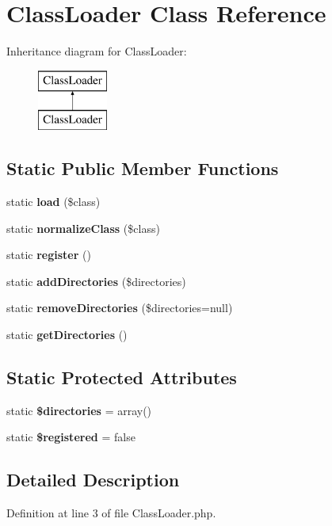 \section{Class\+Loader Class Reference}
\label{class_illuminate_1_1_support_1_1_class_loader}
Inheritance diagram for Class\+Loader\+:\begin{figure}[H]
\begin{center}
\leavevmode
\includegraphics[height=2.000000cm]{class_illuminate_1_1_support_1_1_class_loader}
\end{center}
\end{figure}
\subsection*{Static Public Member Functions}
\begin{DoxyCompactItemize}
\item 
static {\bf load} (\$class)
\item 
static {\bf normalize\+Class} (\$class)
\item 
static {\bf register} ()
\item 
static {\bf add\+Directories} (\$directories)
\item 
static {\bf remove\+Directories} (\$directories=null)
\item 
static {\bf get\+Directories} ()
\end{DoxyCompactItemize}
\subsection*{Static Protected Attributes}
\begin{DoxyCompactItemize}
\item 
static {\bf \$directories} = array()
\item 
static {\bf \$registered} = false
\end{DoxyCompactItemize}


\subsection{Detailed Description}


Definition at line 3 of file Class\+Loader.\+php.



